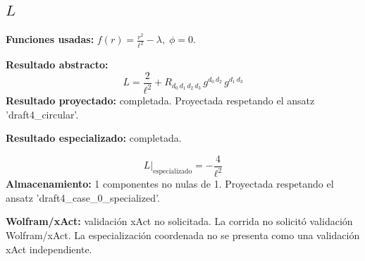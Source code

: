 \documentclass[11pt]{article}
\begin{document}
\subsection*{$ L $}
\textbf{Funciones usadas:} $ f\!\left(r\right) = \frac{{r}^{2}}{{\ell}^{2}} - \lambda,\;\phi=0 $.\par
\textbf{Resultado abstracto:}
\begin{dmath*}[breakdepth={5}]
L = \frac{2}{{\ell}^{2}} + R{}_{d_{0}\,d_{1}\,d_{2}\,d_{3}}\,g{}^{d_{0}\,d_{2}}\,g{}^{d_{1}\,d_{3}}
\end{dmath*}
\textbf{Resultado proyectado:} completada. Proyectada respetando el ansatz 'draft4\_circular'.\par
\textbf{Resultado especializado:} completada.\par
\begin{dmath*}[breakdepth={5}]
L\big|_{\mathrm{especializado}} = -\frac{4}{{\ell}^{2}}
\end{dmath*}
\textbf{Almacenamiento:} 1 componentes no nulas de 1. Proyectada respetando el ansatz 'draft4\_case\_0\_specialized'.\par
\textbf{Wolfram/xAct:} validación xAct no solicitada. La corrida no solicitó validación Wolfram/xAct. La especialización coordenada no se presenta como una validación xAct independiente.\par\medskip
{}
\end{document}
